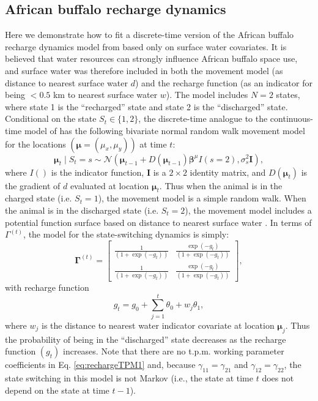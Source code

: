 \documentclass[12pt]{article}\usepackage[]{graphicx}\usepackage[]{xcolor}
\begin{document}
\subsection{African buffalo recharge dynamics}
\label{sec:buffalo}
Here we demonstrate how to fit a discrete-time version of the African buffalo recharge dynamics model from \cite{HootenEtAl2019} based only on surface water covariates. It is believed that water resources can strongly influence African buffalo space use, and surface water was therefore included in both the movement model (as distance to nearest surface water $d$) and the recharge function (as an indicator for being $<0.5$ km to nearest surface water $w$). The model includes $N=2$ states, where state 1 is the ``recharged'' state and state 2 is the ``discharged'' state. Conditional on the state $S_t \in \{1,2\}$, the discrete-time analogue to the continuous-time model of \cite{HootenEtAl2019} has the following bivariate normal random walk movement model for the locations $({\boldsymbol \mu}=(\mu_x,\mu_y))$ at time $t$:
\begin{equation*}
  {\boldsymbol \mu}_t \mid S_t=s \sim \mathcal{N}\left( {\boldsymbol \mu}_{t-1}+D({\boldsymbol \mu}_{t-1}){\boldsymbol \beta}^\mu I(s=2),\sigma_s^2 {\mathbf I} \right),
\end{equation*}
where $I()$ is the indicator function, $\mathbf I$ is a $2 \times 2$ identity matrix, and $D({\boldsymbol \mu}_t)$ is the gradient of $d$ evaluated at location ${\boldsymbol \mu}_t$. %
Thus when the animal is in the charged state (i.e. $S_t=1$), the movement model is a simple random walk. When the animal is in the discharged state (i.e. $S_t=2$), the movement model includes a potential function surface based on distance to nearest surface water \citep[for more on potential functions see][and sections \ref{sec:turtle} and \ref{sec:avoidLand}]{BrillingerEtAl2012,HootenEtAl2017,HootenEtAl2019}. In terms of $\Gamma^{(t)}$, the model for the state-switching dynamics is simply:
\begin{equation}
  {\mathbf \Gamma^{(t)}} = \begin{bmatrix}
    \frac{1}{(1+\exp(-g_t))} & \frac{\exp(-g_t)}{(1+\exp(-g_t))}  \\
    \frac{1}{(1+\exp(-g_t))} & \frac{\exp(-g_t)}{(1+\exp(-g_t))} 
  \end{bmatrix},
  \label{eq:rechargeTPM1}
\end{equation}
with recharge function
\begin{equation*}
  g_t = g_0 + \sum_{j=1}^t \theta_0 + w_j \theta_1,
\end{equation*}
where $w_j$ is the distance to nearest water indicator covariate at location ${\boldsymbol \mu}_j$. Thus the probability of being in the ``discharged'' state decreases as the recharge function $(g_t)$ increases. Note that there are no t.p.m. working parameter coefficients in Eq. \ref{eq:rechargeTPM1} and, because $\gamma_{11}=\gamma_{21}$ and $\gamma_{12}=\gamma_{22}$, the state switching in this model is not Markov (i.e., the state at time $t$ does not depend on the state at time $t-1$). 
\end{document}
